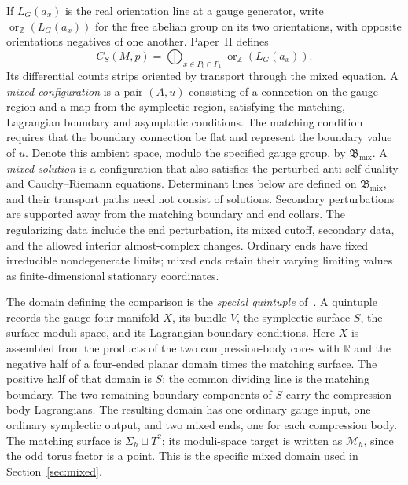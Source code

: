 \documentclass[11pt]{amsart}
\theoremstyle{definition}
\theoremstyle{remark}
\theoremstyle{plain}
\newcommand{\ZZ}{\mathbb Z}
\newcommand{\RR}{\mathbb R}
\newcommand{\CS}{C_S}
\newcommand{\cM}{\mathcal M}
\newcommand{\orZ}{\operatorname{or}_{\ZZ}}
\begin{document}
If $L_G(a_x)$ is the real orientation line at a gauge generator,
write $\orZ(L_G(a_x))$ for the free abelian group on its two
orientations, with opposite orientations negatives of one another.
Paper~II defines
\[
 \CS(M,p)=\bigoplus_{x\in P_0\cap P_1}\orZ(L_G(a_x)).
\]
Its differential counts strips oriented by transport through the
mixed equation. A \emph{mixed configuration} is a pair $(A,u)$ consisting of a
connection on the gauge region and a map from the symplectic region,
satisfying the matching, Lagrangian boundary and asymptotic conditions.
The matching condition requires that the boundary connection be flat
and represent the boundary value of $u$. Denote this ambient space,
modulo the specified gauge group, by $\mathfrak B_{\mathrm{mix}}$.
A \emph{mixed solution} is a configuration that also satisfies the
perturbed anti-self-duality and Cauchy--Riemann equations. Determinant
lines below are defined on $\mathfrak B_{\mathrm{mix}}$, and their
transport paths need not consist of solutions. Secondary perturbations
are supported away from the matching boundary and end collars.
The regularizing data include the end perturbation, its mixed
cutoff, secondary data, and the allowed interior almost-complex
changes. Ordinary ends have fixed irreducible nondegenerate limits;
mixed ends retain their varying limiting values as finite-dimensional
stationary coordinates.

The domain defining the comparison is the \emph{special quintuple}
of~\cite[Section~3.1, Figures~1--2]{DFL}. A quintuple records the gauge
four-manifold $X$, its bundle $V$, the symplectic surface $S$, the
surface moduli space, and its Lagrangian boundary conditions. Here
$X$ is assembled from the products of the two compression-body cores
with $\RR$ and the negative half of a four-ended planar domain times
the matching surface. The positive half of that domain is $S$;
the common dividing line is the matching boundary. The two remaining
boundary components of $S$ carry the compression-body Lagrangians.
The resulting domain has one ordinary gauge input, one ordinary
symplectic output, and two mixed ends, one for each compression body.
The matching surface is $\Sigma_h\sqcup T^2$; its moduli-space target
is written as $\cM_h$, since the odd torus factor is a point. This
is the specific mixed domain used in Section~\ref{sec:mixed}.
\end{document}
